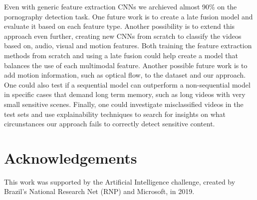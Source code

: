 Even with generic feature extraction CNNs we archieved almost 90\% on the pornography detection task. 
One future work is to create a late fusion model and evaluate it based on each feature type.
Another possibility is to extend this approach even further, creating new CNNs from scratch to classify the videos based on, audio, visual and motion features. Both training the feature extraction methods from scratch and using a late fusion could help create a model that balances the use of each multimodal feature.
Another possible future work is to add motion information, such as optical flow, to the dataset and our approach.
One could also test if a sequential model can outperform a non-sequential model in specific cases that demand long term memory, such as long videos with very small sensitive scenes.
Finally, one could investigate misclassified videos in the test sets and use explainability techniques to search for insights on what circunstances our approach fails to correctly detect sensitive content.

\section{Acknowledgements}
\label{sec:acks}
This work was supported by the Artificial Intelligence challenge, created by Brazil's National Research Net (RNP) and Microsoft, in 2019.